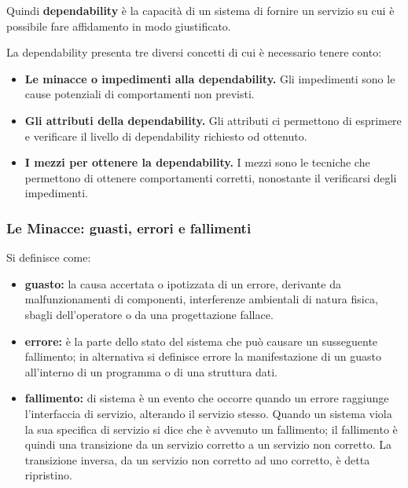 \documentclass[14pt]{extarticle}
\begin{document}
Quindi \textbf{dependability} è
la capacità di un sistema di fornire un servizio su cui è possibile fare affidamento in
modo giustificato.\cite{bondavalli2011analisi}

La dependability presenta tre diversi concetti di cui è necessario tenere conto: \cite{bondavalli2011analisi}
\begin{itemize}
\item \textbf{Le minacce o impedimenti alla dependability.} Gli impedimenti sono le
cause potenziali di comportamenti non previsti.
\item \textbf{Gli attributi della dependability.} Gli attributi ci permettono di esprimere
e verificare il livello di dependability richiesto od ottenuto.
\item \textbf{I mezzi per ottenere la dependability.} I mezzi sono le tecniche che
permettono di ottenere comportamenti corretti, nonostante il verificarsi
degli impedimenti.
\end{itemize}

\subsubsection{Le Minacce: guasti, errori e fallimenti}
Si definisce come:\cite{bondavalli2011analisi}
\begin{itemize}
\item \textbf{guasto:} la causa accertata o ipotizzata di un errore, derivante da malfunzionamenti di componenti, interferenze ambientali di natura fisica, sbagli dell'operatore o da una progettazione fallace.
\item \textbf{errore:} è la parte dello stato del sistema che può causare un susseguente fallimento; in alternativa si definisce errore la manifestazione di un guasto all'interno di un programma o di una struttura dati.
\item \textbf{fallimento:} di sistema è un evento che occorre quando un errore raggiunge l'interfaccia di servizio, alterando il servizio stesso. Quando un sistema viola la sua specifica di servizio si dice che è avvenuto un fallimento; il fallimento è quindi una transizione da un servizio corretto a un servizio non corretto. La transizione inversa, da un servizio non corretto ad uno corretto, è detta ripristino.
\end{itemize}
\end{document}

